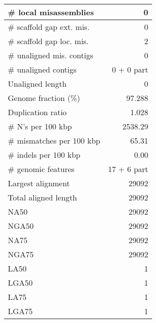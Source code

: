 \documentclass[12pt,a4paper]{article}
\begin{document}
\begin{table}[ht]
\begin{center}
\begin{tabular}{|l*{1}{|r}|}
\# local misassemblies & 0 \\ \hline
\# scaffold gap ext. mis. & 0 \\ \hline
\# scaffold gap loc. mis. & 2 \\ \hline
\# unaligned mis. contigs & 0 \\ \hline
\# unaligned contigs & 0 + 0 part \\ \hline
Unaligned length & 0 \\ \hline
Genome fraction (\%) & 97.288 \\ \hline
Duplication ratio & 1.028 \\ \hline
\# N's per 100 kbp & 2538.29 \\ \hline
\# mismatches per 100 kbp & 65.31 \\ \hline
\# indels per 100 kbp & 0.00 \\ \hline
\# genomic features & 17 + 6 part \\ \hline
Largest alignment & 29092 \\ \hline
Total aligned length & 29092 \\ \hline
NA50 & 29092 \\ \hline
NGA50 & 29092 \\ \hline
NA75 & 29092 \\ \hline
NGA75 & 29092 \\ \hline
LA50 & 1 \\ \hline
LGA50 & 1 \\ \hline
LA75 & 1 \\ \hline
LGA75 & 1 \\ \hline
\end{tabular}
\end{center}
\end{table}
\end{document}
